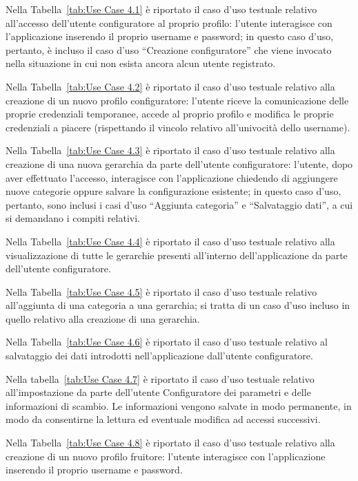 Nella Tabella~\ref{tab:Use Case 4.1} è riportato il caso d'uso testuale relativo all'accesso dell'utente configuratore al proprio profilo: l'utente interagisce con l'applicazione inserendo il proprio username e password; in questo caso d'uso, pertanto, è incluso il caso d'uso ``Creazione configuratore'' che viene invocato nella situazione in cui non esista ancora alcun utente registrato.\bigskip

Nella Tabella~\ref{tab:Use Case 4.2} è riportato il caso d'uso testuale relativo alla creazione di un nuovo profilo configuratore: l'utente riceve la comunicazione delle proprie credenziali temporanee, accede al proprio profilo e modifica le proprie credenziali a piacere (rispettando il vincolo relativo all'univocità dello username).\bigskip

Nella Tabella~\ref{tab:Use Case 4.3} è riportato il caso d'uso testuale relativo alla creazione di una nuova gerarchia da parte dell'utente configuratore: l'utente, dopo aver effettuato l'accesso, interagisce con l'applicazione chiedendo di aggiungere nuove categorie oppure salvare la configurazione esistente; in questo caso d'uso, pertanto, sono inclusi i casi d'uso ``Aggiunta categoria'' e ``Salvataggio dati'', a cui si demandano i compiti relativi.\bigskip

Nella Tabella~\ref{tab:Use Case 4.4} è riportato il caso d'uso testuale relativo alla visualizzazione di tutte le gerarchie presenti all'interno dell'applicazione da parte dell'utente configuratore.\bigskip

Nella Tabella~\ref{tab:Use Case 4.5} è riportato il caso d'uso testuale relativo all'aggiunta di una categoria a una gerarchia; si tratta di un caso d'uso incluso in quello relativo alla creazione di una gerarchia.\bigskip

Nella Tabella~\ref{tab:Use Case 4.6} è riportato il caso d'uso testuale relativo al salvataggio dei dati introdotti nell'applicazione dall'utente configuratore.\bigskip

Nella tabella~\ref{tab:Use Case 4.7} è riportato il caso d'uso testuale relativo all'impostazione da parte dell'utente Configuratore dei parametri e delle informazioni di scambio. Le informazioni vengono salvate in modo permanente, in modo da consentirne la lettura ed eventuale modifica ad accessi successivi.\bigskip

Nella Tabella~\ref{tab:Use Case 4.8} è riportato il caso d'uso testuale relativo alla creazione di un nuovo profilo fruitore: l'utente interagisce con l'applicazione inserendo il proprio username e password.\bigskip

